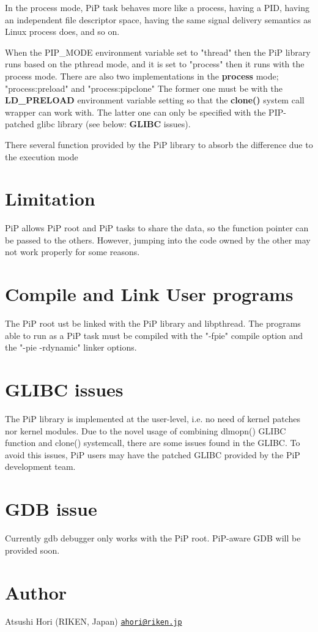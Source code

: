 In the process mode, Pi\-P task behaves more like a process, having a P\-I\-D, having an independent file descriptor space, having the same signal delivery semantics as Linux process does, and so on.

When the {\ttfamily P\-I\-P\-\_\-\-M\-O\-D\-E} environment variable set to "thread" then the Pi\-P library runs based on the pthread mode, and it is set to "process" then it runs with the process mode. There are also two implementations in the {\bfseries process} mode; "process\-:preload" and "process\-:pipclone" The former one must be with the {\bfseries L\-D\-\_\-\-P\-R\-E\-L\-O\-A\-D} environment variable setting so that the {\bfseries clone()} system call wrapper can work with. The latter one can only be specified with the P\-I\-P-\/patched glibc library (see below\-: {\bfseries G\-L\-I\-B\-C} issues).

There several function provided by the Pi\-P library to absorb the difference due to the execution mode\hypertarget{index_limitation}{}\section{Limitation}\label{index_limitation}
Pi\-P allows Pi\-P root and Pi\-P tasks to share the data, so the function pointer can be passed to the others. However, jumping into the code owned by the other may not work properly for some reasons.\hypertarget{index_compile-and-link}{}\section{Compile and Link User programs}\label{index_compile-and-link}
The Pi\-P root ust be linked with the Pi\-P library and libpthread. The programs able to run as a Pi\-P task must be compiled with the "-\/fpie" compile option and the "-\/pie -\/rdynamic" linker options.\hypertarget{index_glibc-issues}{}\section{G\-L\-I\-B\-C issues}\label{index_glibc-issues}
The Pi\-P library is implemented at the user-\/level, i.\-e. no need of kernel patches nor kernel modules. Due to the novel usage of combining {\ttfamily dlmopn()} G\-L\-I\-B\-C function and {\ttfamily clone()} systemcall, there are some issues found in the G\-L\-I\-B\-C. To avoid this issues, Pi\-P users may have the patched G\-L\-I\-B\-C provided by the Pi\-P development team.\hypertarget{index_gdb-issue}{}\section{G\-D\-B issue}\label{index_gdb-issue}
Currently gdb debugger only works with the Pi\-P root. Pi\-P-\/aware G\-D\-B will be provided soon.\hypertarget{index_author}{}\section{Author}\label{index_author}
Atsushi Hori (R\-I\-K\-E\-N, Japan) \href{mailto:ahori@riken.jp}{\tt ahori@riken.\-jp} 